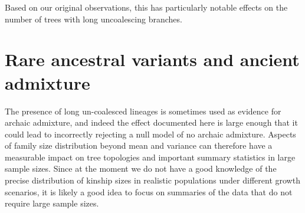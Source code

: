 \documentclass[review,nonatbib]{elsarticle}
\begin{document}
Based on our original observations, this has particularly notable effects on the number of trees with long uncoalescing branches.  

\section{Rare ancestral variants and ancient admixture}
The presence of long un-coalesced lineages is sometimes used as evidence for archaic admixture, and indeed the effect documented here is 
large enough that it could lead to incorrectly rejecting a null model of no archaic admixture. Aspects of family size distribution beyond mean 
and variance can therefore have a measurable impact on tree topologies and important summary statistics in large sample sizes. 
Since at the moment we do not have a good knowledge of the precise distribution of kinship sizes in realistic populations under different 
growth scenarios, it is likely a good idea to focus on summaries of the data that do not require large sample sizes. 
 

 
\end{document}
